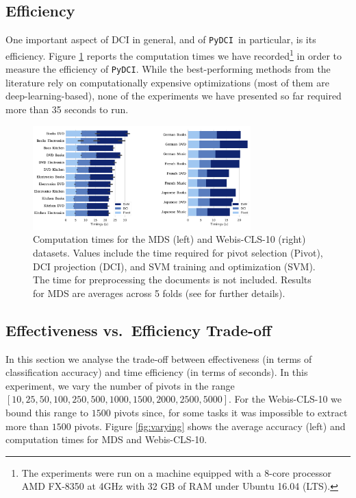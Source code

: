 \documentclass{article}
\newcommand{\pydci}{\texttt{PyDCI}}
\begin{document}

\subsection{Efficiency}
\label{sec:efficiency}

\noindent One important aspect of DCI in general, and of \pydci\ in
particular, is its efficiency. Figure \ref{fig:timings} reports the
computation times we have recorded\footnote{The experiments were run
on a machine equipped with a 8-core processor AMD FX-8350 at 4GHz with
32 GB of RAM under Ubuntu 16.04 (LTS).} in order to measure the
efficiency of \pydci.  While the best-performing methods from the
literature rely on computationally expensive optimizations (most of
them are deep-learning-based), none of the experiments we have
presented so far required more than 35 seconds to run.

\begin{figure}[ht!]
  \centering \includegraphics[width=0.75\textwidth]{mds_webis.pdf}
  \caption{Computation times for the MDS (left) and Webis-CLS-10
  (right) datasets. Values include the time required for pivot
  selection (Pivot), DCI projection (DCI), and SVM training and
  optimization (SVM). The time for %
  preprocessing the documents is not included. Results for MDS are
  averages across 5 folds (see \citep{Blitzer:2007gf} for further
  details).}
  \label{fig:timings}
\end{figure}


\subsection{Effectiveness vs.\ Efficiency Trade-off}
\label{sec:effvseff}

\noindent In this section we analyse the trade-off between
effectiveness (in terms of classification accuracy) and time
efficiency (in terms of seconds).  In this experiment, we vary the
number of pivots in the range
$[10,25,50,100,250,500,1000,1500,2000,2500,5000]$.  For the
Webis-CLS-10 we bound this range to $1500$ pivots since, for some
tasks it was impossible to extract more than $1500$ pivots.  Figure
\ref{fig:varying} shows the average accuracy (left) and computation
times for MDS and Webis-CLS-10.
\end{document}
